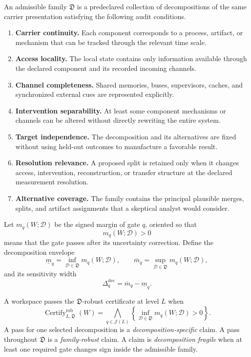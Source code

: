 \begin{SRWTdefinition}
\label{SRWT:def:admissible-decomposition-family}
An admissible family \(\mathfrak D\) is a predeclared collection of
decompositions of the same carrier presentation satisfying the following
audit conditions.
\begin{enumerate}
\item \textbf{Carrier continuity.} Each component corresponds to a process,
 artifact, or mechanism that can be tracked through the relevant time scale.
\item \textbf{Access locality.} The local state contains only information
 available through the declared component and its recorded incoming channels.
\item \textbf{Channel completeness.} Shared memories, buses, supervisors,
 caches, and synchronized external cues are represented explicitly.
\item \textbf{Intervention separability.} At least some component mechanisms
 or channels can be altered without directly rewriting the entire system.
\item \textbf{Target independence.} The decomposition and its alternatives
 are fixed without using held-out outcomes to manufacture a favorable result.
\item \textbf{Resolution relevance.} A proposed split is retained only when
 it changes access, intervention, reconstruction, or transfer structure at the
 declared measurement resolution.
\item \textbf{Alternative coverage.} The family contains the principal
 plausible merges, splits, and artifact assignments that a skeptical analyst
 would consider.
\end{enumerate}
\end{SRWTdefinition}

Let \(m_q(W;\mathcal D)\) be the signed margin of gate \(q\), oriented so that
\[
m_q(W;\mathcal D)>0
\]
means that the gate passes after its uncertainty correction. Define the
decomposition envelope
\[
\underline m_q
=
\inf_{\mathcal D\in\mathfrak D}m_q(W;\mathcal D),
\qquad
\overline m_q
=
\sup_{\mathcal D\in\mathfrak D}m_q(W;\mathcal D),
\]
and its sensitivity width
\[
\Delta_q^{\mathrm{dec}}
=
\overline m_q-\underline m_q.
\]

\begin{SRWTdefinition}
\label{SRWT:def:decomposition-robust-certificate}
A workspace passes the \(\mathfrak D\)-robust certificate at level \(L\) when
\[
\boxed{
\operatorname{Certify}_{L,\mathfrak D}^{\mathrm{rob}}(W)
=
\bigwedge_{q\in\mathcal J(L)}
\left\{
\inf_{\mathcal D\in\mathfrak D}
 m_q(W;\mathcal D)>0
\right\}.
}
\]
A pass for one selected decomposition is a \emph{decomposition-specific}
claim. A pass throughout \(\mathfrak D\) is a \emph{family-robust} claim. A
claim is \emph{decomposition fragile} when at least one required gate changes
sign inside the admissible family.
\end{SRWTdefinition}

